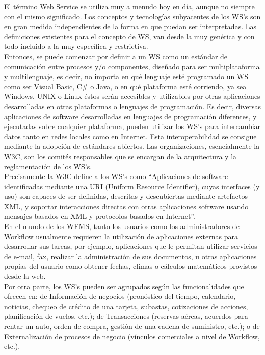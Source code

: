 El término Web Service se utiliza muy a menudo hoy en día, aunque no siempre con el mismo significado. Los conceptos y tecnologías subyacentes de los WS's son en gran medida independientes de la forma en que puedan ser interpretadas. Las definiciones existentes para el concepto de WS, van desde la muy genérica y con todo incluido a la muy específica y restrictiva.\\

Entonces, se puede comenzar por definir a un WS como un estándar de comunicación entre procesos y/o componentes, diseñado para ser multiplataforma y multilenguaje, es decir, no importa en qué lenguaje esté programado un WS como ser Visual Basic, C\# o Java, o en qué plataforma esté corriendo, ya sea Windows, UNIX o Linux éstos serán accesibles y utilizables por otras aplicaciones desarrolladas en otras plataformas o lenguajes de programación. Es decir, diversas aplicaciones de software desarrolladas en lenguajes de programación diferentes, y ejecutadas sobre cualquier plataforma, pueden utilizar los WS's para intercambiar datos tanto en redes locales como en Internet. Esta interoperabilidad se consigue mediante la adopción de estándares abiertos. Las organizaciones, esencialmente la W3C, son los comités responsables que se encargan de la arquitectura y la reglamentación de los WS's.\\

Precisamente la W3C define a los WS's como ``Aplicaciones de software identificadas mediante una URI (Uniform Resource Identifier), cuyas interfaces (y uso) son capaces de ser definidas, descritas y descubiertas mediante artefactos XML, y soportar interacciones directas con otras aplicaciones software usando mensajes basados en XML y protocolos basados en Internet''.\\

En el mundo de los WFMS, tanto los usuarios como los administradores de Workflow usualmente requieren la utilización de aplicaciones externas para desarrollar sus tareas, por ejemplo, aplicaciones que le permitan utilizar servicios de e-mail, fax, realizar la administración de sus documentos, u otras aplicaciones propias del usuario como obtener fechas, climas o cálculos matemáticos provistos desde la web.\\

Por otra parte, los WS's pueden ser agrupados según las funcionalidades que ofrecen en: de Información de negocios (pronóstico del tiempo, calendario, noticias, chequeo de crédito de una tarjeta, subastas, cotizaciones de acciones, planificación de vuelos, etc.); de Transacciones (reservas aéreas, acuerdos para rentar un auto, orden de compra, gestión de una cadena de suministro, etc.); o de Externalización de procesos de negocio (vínculos comerciales a nivel de Workflow, etc.).\\

